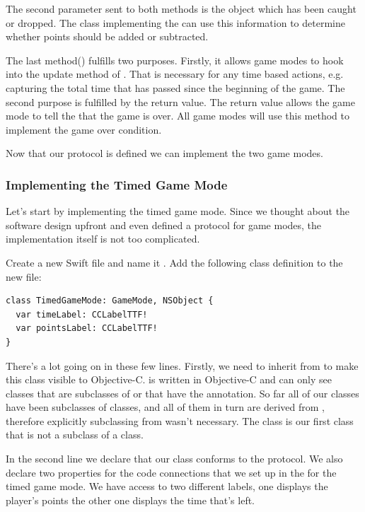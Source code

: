 The second parameter sent to both methods is the object which has been caught or dropped. The class implementing
the  can use this information to determine whether
points should be added or subtracted.

The last method() fulfills two purposes. Firstly, it
allows game modes to hook into the update method of . That
is necessary for any time based actions, e.g. capturing the total time that
has passed since the beginning of the game. The second purpose is fulfilled by
the  return value. The return value allows the game mode to
tell the  that the game is over. All game modes will use
this method to implement the game over condition.

Now that our protocol is defined we can implement the two game modes. 

\subsubsection{Implementing the Timed Game Mode}
Let's start by implementing the timed game mode. Since we thought about the
software design upfront and even defined a protocol for game modes, the
implementation itself is not too complicated.

\begin{leftbar}
Create a new Swift file and name it . Add the
following class definition to the new file:
\begin{lstlisting}
class TimedGameMode: GameMode, NSObject {
  var timeLabel: CCLabelTTF!
  var pointsLabel: CCLabelTTF!
}
\end{lstlisting}
\end{leftbar}
There's a lot going on in these few lines. Firstly, we need to inherit from
 to make this class visible to Objective-C.
\cocos{} is written in Objective-C and can only see classes that are subclasses of
 or that have the  annotation. So far all
of our classes have been subclasses of \cocos{} classes, and all of them in turn
are derived from , therefore explicitly subclassing from
 wasn't necessary.
The  class is our first class that is not a subclass
of a \cocos{} class.

In the second line we declare that our class conforms to the
 protocol. We also declare two properties
for the code connections that we set up in the \ccbfile{} for the timed game
mode. We have access to two different labels, one displays the player's
points the other one displays the time that's left.

